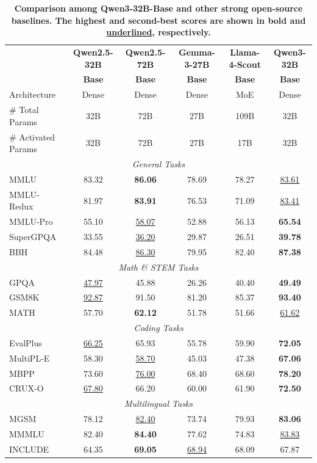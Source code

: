 \documentclass[dvipsnames]{article}
\begin{document}
\begin{table}[tbp]
\centering
\caption{\textbf{Comparison among Qwen3-32B-Base and other strong open-source baselines. The highest and second-best scores are shown in \textbf{bold} and \underline{underlined}, respectively.}}
\label{tab:base-32B}
\small
\begin{tabular}{@{}lccccc@{}}
\toprule
 & \textbf{Qwen2.5-32B} & \textbf{Qwen2.5-72B} & \textbf{Gemma-3-27B} & \textbf{Llama-4-Scout} & \textbf{Qwen3-32B} \\
 & \textbf{Base} & \textbf{Base} & \textbf{Base} & \textbf{Base}& \textbf{Base} \\
\midrule
Architecture & Dense & Dense & Dense & MoE & Dense\\
\# Total Params & 32B & 72B & 27B & 109B & 32B\\
\# Activated Params & 32B & 72B & 27B & 17B & 32B\\
\midrule
\multicolumn{6}{c}{\textit{General Tasks}} \\
\midrule
MMLU & 83.32 & \textbf{86.06} & 78.69 & 78.27 & \underline{83.61} \\
MMLU-Redux & 81.97 & \textbf{83.91} & 76.53 & 71.09 & \underline{83.41} \\
MMLU-Pro & 55.10 & \underline{58.07} & 52.88 & 56.13 & \textbf{65.54} \\
SuperGPQA & 33.55 & \underline{36.20} & 29.87 & 26.51 & \textbf{39.78} \\
BBH & 84.48 & \underline{86.30} & 79.95 & 82.40 & \textbf{87.38} \\
\midrule
\multicolumn{6}{c}{\textit{Math \& STEM Tasks}} \\
\midrule
GPQA & \underline{47.97} & 45.88 & 26.26 & 40.40 & \textbf{49.49} \\
GSM8K & \underline{92.87} & 91.50 & 81.20 & 85.37 & \textbf{93.40} \\
MATH & 57.70 & \textbf{62.12} & 51.78 & 51.66 & \underline{61.62} \\
\midrule
\multicolumn{6}{c}{\textit{Coding Tasks}} \\
\midrule
EvalPlus & \underline{66.25} & 65.93 & 55.78 & 59.90 & \textbf{72.05} \\
MultiPL-E & 58.30 & \underline{58.70} & 45.03 & 47.38 & \textbf{67.06} \\
MBPP & 73.60 & \underline{76.00} & 68.40 & 68.60 & \textbf{78.20} \\
CRUX-O & \underline{67.80} & 66.20 & 60.00 & 61.90 & \textbf{72.50} \\
\midrule
\multicolumn{6}{c}{\textit{Multilingual Tasks}} \\
\midrule
MGSM & 78.12 & \underline{82.40} & 73.74 & 79.93 & \textbf{83.06} \\
MMMLU & 82.40 & \textbf{84.40} & 77.62 & 74.83 & \underline{83.83} \\
INCLUDE & 64.35 & \textbf{69.05} & \underline{68.94} & 68.09 & 67.87 \\
\bottomrule
\end{tabular}
\end{table}
\end{document}

